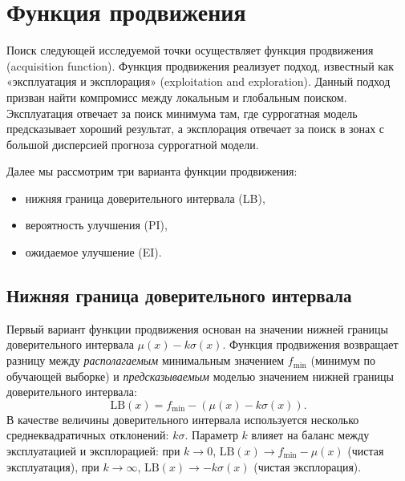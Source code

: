 \documentclass[11pt,a4paper]{article}
\providecommand{\tightlist}{%
      \setlength{\itemsep}{0pt}\setlength{\parskip}{0pt}}
\begin{document}

    \hypertarget{ux444ux443ux43dux43aux446ux438ux44f-ux43fux440ux43eux434ux432ux438ux436ux435ux43dux438ux44f}{%
\section{Функция
продвижения}\label{ux444ux443ux43dux43aux446ux438ux44f-ux43fux440ux43eux434ux432ux438ux436ux435ux43dux438ux44f}}

    Поиск следующей исследуемой точки осуществляет функция продвижения
(acquisition function). Функция продвижения реализует подход, известный
как «эксплуатация и эксплорация» (exploitation and exploration). Данный
подход призван найти компромисс между локальным и глобальным поиском.
Эксплуатация отвечает за поиск минимума там, где суррогатная модель
предсказывает хороший результат, а эксплорация отвечает за поиск в зонах
с большой дисперсией прогноза суррогатной модели.

    Далее мы рассмотрим три варианта функции продвижения:

\begin{itemize}
\tightlist
\item
  нижняя граница доверительного интервала (LB),
\item
  вероятность улучшения (PI),
\item
  ожидаемое улучшение (EI).
\end{itemize}

    \hypertarget{ux43dux438ux436ux43dux44fux44f-ux433ux440ux430ux43dux438ux446ux430-ux434ux43eux432ux435ux440ux438ux442ux435ux43bux44cux43dux43eux433ux43e-ux438ux43dux442ux435ux440ux432ux430ux43bux430}{%
\subsection{Нижняя граница доверительного
интервала}\label{ux43dux438ux436ux43dux44fux44f-ux433ux440ux430ux43dux438ux446ux430-ux434ux43eux432ux435ux440ux438ux442ux435ux43bux44cux43dux43eux433ux43e-ux438ux43dux442ux435ux440ux432ux430ux43bux430}}

Первый вариант функции продвижения основан на значении нижней границы
доверительного интервала \(\mu(x) - k \sigma(x)\). Функция продвижения
возвращает разницу между \emph{располагаемым} минимальным значением
\(f_\mathrm{min}\) (минимум по обучающей выборке) и
\emph{предсказываемым} моделью значением нижней границы доверительного
интервала:
\[
  \mathrm{LB}(x) = f_\mathrm{min} - \left(\mu(x) - k \sigma(x) \right).
\]
В качестве величины доверительного интервала используется несколько
среднеквадратичных отклонений: \(k\sigma\). Параметр \(k\) влияет на
баланс между эксплуатацией и эксплорацией: при \(k \rightarrow 0\),
\(\mathrm{LB}(x) \rightarrow f_\mathrm{min} - \mu(x)\) (чистая
эксплуатация), при \(k \rightarrow \infty\),
\(\mathrm{LB}(x) \rightarrow -k \sigma(x)\) (чистая эксплорация).
\end{document}
